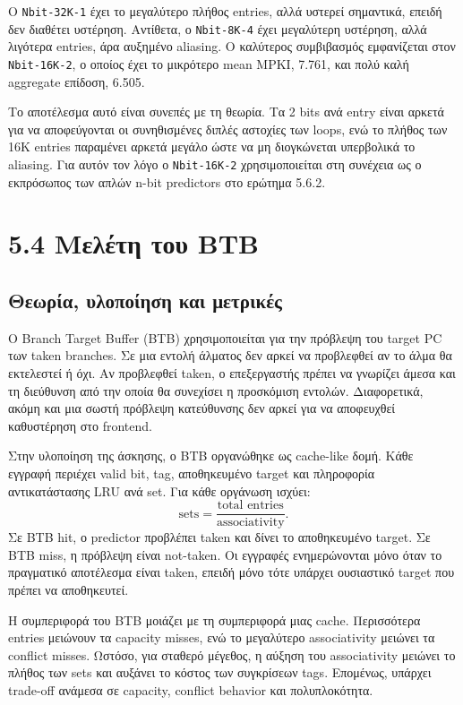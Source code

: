 \documentclass{article}
\begin{document}
Ο \texttt{Nbit-32K-1} έχει το μεγαλύτερο πλήθος entries, αλλά υστερεί σημαντικά, επειδή δεν διαθέτει υστέρηση. Αντίθετα, ο \texttt{Nbit-8K-4} έχει μεγαλύτερη υστέρηση, αλλά λιγότερα entries, άρα αυξημένο aliasing. Ο καλύτερος συμβιβασμός εμφανίζεται στον \texttt{Nbit-16K-2}, ο οποίος έχει το μικρότερο mean MPKI, 7.761, και πολύ καλή aggregate επίδοση, 6.505.

Το αποτέλεσμα αυτό είναι συνεπές με τη θεωρία. Τα 2 bits ανά entry είναι αρκετά για να αποφεύγονται οι συνηθισμένες διπλές αστοχίες των loops, ενώ το πλήθος των 16K entries παραμένει αρκετά μεγάλο ώστε να μη διογκώνεται υπερβολικά το aliasing. Για αυτόν τον λόγο ο \texttt{Nbit-16K-2} χρησιμοποιείται στη συνέχεια ως ο εκπρόσωπος των απλών n-bit predictors στο ερώτημα 5.6.2.

\FloatBarrier
\section{5.4 Μελέτη του BTB}

\subsection{Θεωρία, υλοποίηση και μετρικές}

Ο \foreignlanguage{english}{Branch Target Buffer} (BTB) χρησιμοποιείται για την πρόβλεψη του target PC των taken branches. Σε μια εντολή άλματος δεν αρκεί να προβλεφθεί αν το άλμα θα εκτελεστεί ή όχι. Αν προβλεφθεί taken, ο επεξεργαστής πρέπει να γνωρίζει άμεσα και τη διεύθυνση από την οποία θα συνεχίσει η προσκόμιση εντολών. Διαφορετικά, ακόμη και μια σωστή πρόβλεψη κατεύθυνσης δεν αρκεί για να αποφευχθεί καθυστέρηση στο frontend.

Στην υλοποίηση της άσκησης, ο BTB οργανώθηκε ως cache-like δομή. Κάθε εγγραφή περιέχει valid bit, tag, αποθηκευμένο target και πληροφορία αντικατάστασης LRU ανά set. Για κάθε οργάνωση ισχύει:
\[
    \text{sets} =
    \frac{\text{total entries}}{\text{associativity}}.
\]
Σε BTB hit, ο predictor προβλέπει taken και δίνει το αποθηκευμένο target. Σε BTB miss, η πρόβλεψη είναι not-taken. Οι εγγραφές ενημερώνονται μόνο όταν το πραγματικό αποτέλεσμα είναι taken, επειδή μόνο τότε υπάρχει ουσιαστικό target που πρέπει να αποθηκευτεί.

Η συμπεριφορά του BTB μοιάζει με τη συμπεριφορά μιας cache. Περισσότερα entries μειώνουν τα capacity misses, ενώ το μεγαλύτερο associativity μειώνει τα conflict misses. Ωστόσο, για σταθερό μέγεθος, η αύξηση του associativity μειώνει το πλήθος των sets και αυξάνει το κόστος των συγκρίσεων tags. Επομένως, υπάρχει trade-off ανάμεσα σε capacity, conflict behavior και πολυπλοκότητα.
\end{document}
